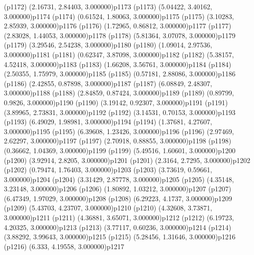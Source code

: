\psdot(p1172)
\psPoint(2.16731, 2.84403, 3.000000){p1173}
\psdot(p1173)
\psPoint(5.04422, 3.40162, 3.000000){p1174}
\psdot(p1174)
\psPoint(0.61524, 1.80063, 3.000000){p1175}
\psdot(p1175)
\psPoint(3.10283, 2.85939, 3.000000){p1176}
\psdot(p1176)
\psPoint(1.72965, 0.86812, 3.000000){p1177}
\psdot(p1177)
\psPoint(2.83028, 1.44053, 3.000000){p1178}
\psdot(p1178)
\psPoint(5.81364, 3.07078, 3.000000){p1179}
\psdot(p1179)
\psPoint(3.29546, 2.54238, 3.000000){p1180}
\psdot(p1180)
\psPoint(1.09014, 2.97536, 3.000000){p1181}
\psdot(p1181)
\psPoint(0.62347, 3.87098, 3.000000){p1182}
\psdot(p1182)
\psPoint(5.38157, 4.52418, 3.000000){p1183}
\psdot(p1183)
\psPoint(1.66208, 3.56761, 3.000000){p1184}
\psdot(p1184)
\psPoint(2.50355, 1.75979, 3.000000){p1185}
\psdot(p1185)
\psPoint(0.57181, 2.88086, 3.000000){p1186}
\psdot(p1186)
\psPoint(2.42855, 0.87898, 3.000000){p1187}
\psdot(p1187)
\psPoint(6.08849, 2.48307, 3.000000){p1188}
\psdot(p1188)
\psPoint(2.84859, 0.87424, 3.000000){p1189}
\psdot(p1189)
\psPoint(0.89799, 0.9826, 3.000000){p1190}
\psdot(p1190)
\psPoint(3.19142, 0.92307, 3.000000){p1191}
\psdot(p1191)
\psPoint(3.89965, 2.73831, 3.000000){p1192}
\psdot(p1192)
\psPoint(3.14531, 0.70153, 3.000000){p1193}
\psdot(p1193)
\psPoint(6.49029, 1.98981, 3.000000){p1194}
\psdot(p1194)
\psPoint(1.37681, 4.27607, 3.000000){p1195}
\psdot(p1195)
\psPoint(6.39608, 1.23426, 3.000000){p1196}
\psdot(p1196)
\psPoint(2.97469, 2.62297, 3.000000){p1197}
\psdot(p1197)
\psPoint(2.70918, 0.88855, 3.000000){p1198}
\psdot(p1198)
\psPoint(0.36662, 1.04369, 3.000000){p1199}
\psdot(p1199)
\psPoint(5.49516, 1.60601, 3.000000){p1200}
\psdot(p1200)
\psPoint(3.92914, 2.8205, 3.000000){p1201}
\psdot(p1201)
\psPoint(2.3164, 2.7295, 3.000000){p1202}
\psdot(p1202)
\psPoint(0.79474, 1.76403, 3.000000){p1203}
\psdot(p1203)
\psPoint(3.73619, 0.59661, 3.000000){p1204}
\psdot(p1204)
\psPoint(3.31429, 2.87778, 3.000000){p1205}
\psdot(p1205)
\psPoint(4.35148, 3.23148, 3.000000){p1206}
\psdot(p1206)
\psPoint(1.80892, 1.03212, 3.000000){p1207}
\psdot(p1207)
\psPoint(6.47349, 1.97029, 3.000000){p1208}
\psdot(p1208)
\psPoint(6.29223, 4.1737, 3.000000){p1209}
\psdot(p1209)
\psPoint(5.43703, 4.23707, 3.000000){p1210}
\psdot(p1210)
\psPoint(4.32608, 3.73871, 3.000000){p1211}
\psdot(p1211)
\psPoint(4.36881, 3.65071, 3.000000){p1212}
\psdot(p1212)
\psPoint(6.19723, 4.20325, 3.000000){p1213}
\psdot(p1213)
\psPoint(3.77117, 0.60236, 3.000000){p1214}
\psdot(p1214)
\psPoint(3.88292, 3.99643, 3.000000){p1215}
\psdot(p1215)
\psPoint(5.28456, 1.31646, 3.000000){p1216}
\psdot(p1216)
\psPoint(6.333, 4.19558, 3.000000){p1217}
